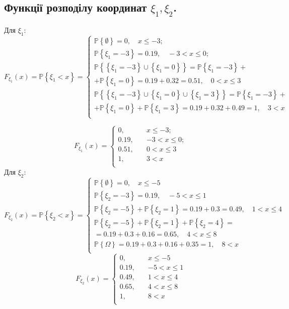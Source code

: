 \documentclass[14pt,a4paper]{scrartcl}
\theoremstyle{definition}
\theoremstyle{remark}
\theoremstyle{definition}
\theoremstyle{definition}
\begin{document}
\subsection{Функції розподілу координат $\xi_1, \xi_2$.}
Для $\xi_1:$
$$F_{\xi_1}(x) = \mathbb{P} \left\lbrace \xi_1 < x \right\rbrace =
\begin{cases}
	\mathbb{P} \left\lbrace \emptyset \right\rbrace  = 0,\quad x \leq -3;\\
	\mathbb{P} \left\lbrace \xi_1 = -3 \right\rbrace = 0.19,\quad -3 < x \leq 0;\\
	\mathbb{P} \left\lbrace \left\lbrace \xi_1 =-3 \right\rbrace \cup \left\lbrace \xi_1 = 0 \right\rbrace   \right\rbrace =
	\mathbb{P} \left\lbrace\xi_1 =-3   \right\rbrace +\\ +	\mathbb{P} \left\lbrace \xi_1 = 0 \right\rbrace   = 0.19 + 0.32 = 0.51,\quad 0 < x \leq 3  \\
	\mathbb{P} \left\lbrace \left\lbrace \xi_1 =-3 \right\rbrace \cup \left\lbrace \xi_1 = 0 \right\rbrace \cup \left\lbrace \xi_1 = 3 \right\rbrace   \right\rbrace =
	\mathbb{P} \left\lbrace\xi_1 =-3   \right\rbrace +\\ +	\mathbb{P} \left\lbrace \xi_1 = 0 \right\rbrace+	\mathbb{P} \left\lbrace \xi_1 = 3 \right\rbrace   = 0.19 + 0.32 + 0.49= 1,\quad 3 < x \\
\end{cases} $$

$$F_{\xi_1}(x) =
\begin{cases}
	0,\quad& x \leq -3;\\
	0.19,\quad &-3 < x \leq 0;\\
	0.51,\quad&0 < x \leq 3  \\
	1,\quad& 3 < x \\
\end{cases} $$
Для $\xi_2:$
$$F_{\xi_2}(x) = \mathbb{P} \left\lbrace \xi_2 < x \right\rbrace =
\begin{cases}
	\mathbb{P} \left\lbrace \emptyset \right\rbrace = 0, \quad x \leq -5\\
	\mathbb{P} \left\lbrace \xi_2 = -3 \right\rbrace = 0.19, \quad -5 < x \leq 1\\
	\mathbb{P} \left\lbrace \xi_2 = -5  \right\rbrace + \mathbb{P} \left\lbrace \xi_2 = 1 \right\rbrace = 0.19 + 0.3 = 0.49, \quad  1 < x \leq 4\\
		\mathbb{P} \left\lbrace \xi_2 = -5  \right\rbrace + \mathbb{P} \left\lbrace \xi_2 = 1 \right\rbrace + \mathbb{P} \left\lbrace \xi_2 = 4 \right\rbrace =\\= 0.19 + 0.3 + 0.16= 0.65, \quad  4 < x \leq 8\\
	 \mathbb{P} \left\lbrace \Omega \right\rbrace= 0.19 + 0.3 + 0.16 + 0.35= 1, \quad  8 < x \\
\end{cases} $$
$$F_{\xi_2}(x) =
\begin{cases}
	0, \quad& x \leq -5\\
	0.19, \quad &-5 < x \leq 1\\
  0.49, \quad & 1 < x \leq 4\\
	0.65, \quad & 4 < x \leq 8\\
	1, \quad&  8 < x \\
\end{cases} $$
\end{document}
